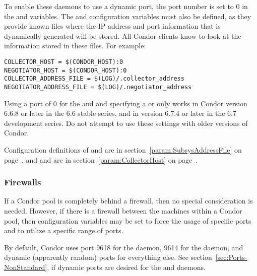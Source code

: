To enable these daemons to use a dynamic port,
the port number is set to 0 in the  and
 variables.
The  and 
configuration variables must also be defined,
as they provide known files where the IP address
and port information that is dynamically generated will be stored.
All Condor clients know to look at the
information stored in these files.
For example:
\footnotesize
\begin{verbatim}
COLLECTOR_HOST = $(CONDOR_HOST):0
NEGOTIATOR_HOST = $(CONDOR_HOST):0
COLLECTOR_ADDRESS_FILE = $(LOG)/.collector_address
NEGOTIATOR_ADDRESS_FILE = $(LOG)/.negotiator_address
\end{verbatim}
\normalsize

\Note Using a port of 0 for the  and
 and specifying a
 or
only works in Condor version 6.6.8 or later in the 6.6 stable series,
and in version 6.7.4 or later in the 6.7 development series.
Do not attempt to use these settings with older versions of Condor.

Configuration definitions of 
and 
are in section~\ref{param:SubsysAddressFile} on
page~\pageref{param:SubsysAddressFile},
and
 and
 are in
section~\ref{param:CollectorHost} on
page~\pageref{param:CollectorHost}.



\subsubsection{\label{sec:Ports-Firewalls}Firewalls}

If a Condor pool is completely behind a firewall,
then no special consideration is needed.
However, if there is a firewall between the machines within
a Condor pool, then
configuration variables may be set to force the usage of
specific ports and to utilize a specific range of ports.

By default,
Condor uses port 9618 for the  daemon,
9614 for the  daemon,
and dynamic (apparently random) ports for everything else.
See section~\ref{sec:Ports-NonStandard},
if dynamic ports are desired for the
 and  daemons.

